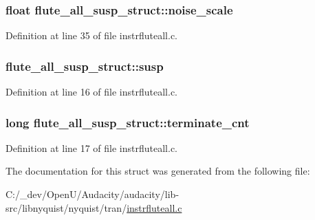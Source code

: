 \subsubsection[{\texorpdfstring{noise\+\_\+scale}{noise_scale}}]{\setlength{\rightskip}{0pt plus 5cm}float flute\+\_\+all\+\_\+susp\+\_\+struct\+::noise\+\_\+scale}\hypertarget{structflute__all__susp__struct_ae97f7d9063b1e5bcbaa6e5469b0d7029}{}\label{structflute__all__susp__struct_ae97f7d9063b1e5bcbaa6e5469b0d7029}


Definition at line 35 of file instrfluteall.\+c.

\subsubsection[{\texorpdfstring{susp}{susp}}]{ flute\+\_\+all\+\_\+susp\+\_\+struct\+::susp}\hypertarget{structflute__all__susp__struct_afa541f45e24cb362f093246e91f13b1d}{}\label{structflute__all__susp__struct_afa541f45e24cb362f093246e91f13b1d}


Definition at line 16 of file instrfluteall.\+c.

\subsubsection[{\texorpdfstring{terminate\+\_\+cnt}{terminate_cnt}}]{\setlength{\rightskip}{0pt plus 5cm}long flute\+\_\+all\+\_\+susp\+\_\+struct\+::terminate\+\_\+cnt}\hypertarget{structflute__all__susp__struct_a932b82614ea602dce0e45ea35ebba5e0}{}\label{structflute__all__susp__struct_a932b82614ea602dce0e45ea35ebba5e0}


Definition at line 17 of file instrfluteall.\+c.



The documentation for this struct was generated from the following file\+:\begin{DoxyCompactItemize}
\item 
C\+:/\+\_\+dev/\+Open\+U/\+Audacity/audacity/lib-\/src/libnyquist/nyquist/tran/\hyperlink{instrfluteall_8c}{instrfluteall.\+c}\end{DoxyCompactItemize}
